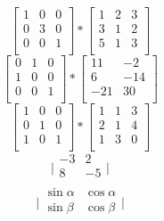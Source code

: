 \documentclass[12pt, a4paper]{article}
\begin{document}
\begin{equation}
\left[
\begin{array}{ccc}
1 & 0 & 0 \\
0 & 3 & 0 \\
0 & 0 & 1 \\
\end{array}
\right]
*
\left[
\begin{array}{ccc}
1 & 2 & 3 \\
3 & 1 & 2 \\
5 & 1 & 3 \\
\end{array}
\right]
\end{equation}
\begin{equation}
\left[
\begin{array}{ccc}
0 & 1 & 0 \\
1 & 0 & 0 \\
0 & 0 & 1 \\
\end{array}
\right]
*
\left[
\begin{array}{cc}
11 & -2 \\
6 & -14 \\
-21 & 30 \\
\end{array}
\right]
\end{equation}
\begin{equation}
\left[
\begin{array}{ccc}
1 & 0 & 0 \\
0 & 1 & 0 \\
1 & 0 & 1 \\
\end{array}
\right]
*
\left[
\begin{array}{ccc}
1 & 1 & 3 \\
2 & 1 & 4 \\
1 & 3 & 0 \\
\end{array}
\right]
\end{equation}
\begin{equation}
\bigg|
\begin{array}{rr}
-3 & 2 \\
8 & -5 \\
\end{array}
\bigg|
\end{equation}
\begin{equation}
\bigg|
\begin{array}{cc}
\sin \alpha & \cos \alpha \\
\sin \beta & \cos \beta \\
\end{array}
\bigg|
\end{equation}
\end{document}
